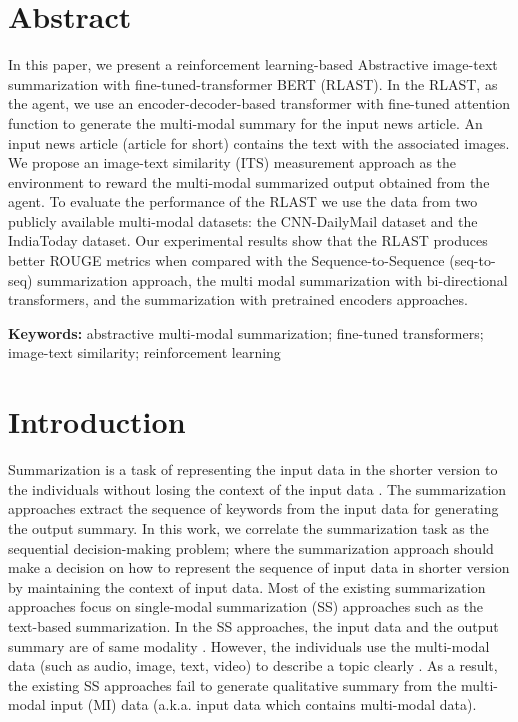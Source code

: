\documentclass[preprint,review,12pt]{elsarticle}
\begin{document}
	
	\section{Abstract}\label{sec:abstract}
	In this paper, we present a reinforcement learning-based Abstractive image-text summarization with fine-tuned-transformer BERT (RLAST). In the RLAST, as the agent, we use an encoder-decoder-based transformer with fine-tuned attention function to generate the multi-modal summary for the input news article. An input news article (article for short) contains the text with the associated images. We propose an image-text similarity (ITS) measurement approach as the environment to reward the multi-modal summarized output obtained from the agent. To evaluate the performance of the RLAST we use the data from two publicly available multi-modal datasets: the CNN-DailyMail dataset and the IndiaToday dataset. Our experimental results show that the RLAST produces better ROUGE metrics when compared with the Sequence-to-Sequence (seq-to-seq) summarization approach, the multi modal summarization with bi-directional transformers, and the summarization with pretrained encoders approaches. 
	
	\textbf{Keywords:} abstractive multi-modal summarization; fine-tuned transformers; image-text similarity; reinforcement learning
	
\section{Introduction}\label{sec:Info}	
Summarization is a task of representing the input data in the shorter version to the individuals without losing the context of the input data \cite{1,2,3}. The summarization approaches extract the sequence of keywords from the input data for generating the output summary. In this work, we correlate the summarization task as the sequential decision-making problem; where the summarization approach should make a decision on how to represent the sequence of input data in shorter version by maintaining the context of input data.  Most of the existing summarization approaches focus on single-modal summarization (SS) approaches such as the text-based summarization.  In the SS approaches, the input data and the output summary are of same modality \cite{4,5,6,7}. However, the individuals use the multi-modal data (such as audio, image, text, video) to describe a topic clearly \cite{8,9}. As a result, the existing SS approaches fail to generate qualitative summary from the multi-modal input (MI) data (a.k.a. input data which contains multi-modal data). 
\end{document}
